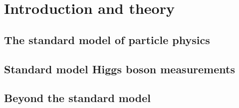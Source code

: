 \chapter{Introduction and theory}
\label{chap:theory}

\section{The standard model of particle physics}
\label{sec:theory_sm}

\section{Standard model Higgs boson measurements}
\label{sec:theory_smH}

\section{Beyond the standard model}
\label{sec:theory_BSM}


